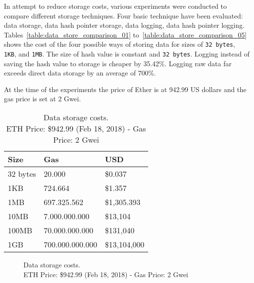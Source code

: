 In attempt to reduce storage costs, various experiments were conducted to compare different storage techniques. Four basic technique have been evaluated: data storage, data hash pointer storage, data logging, data hash pointer logging. Tables~\ref{table:data_store_comparison_01} to~\ref{table:data_store_comparison_05} shows the cost of the four possible ways of storing data for sizes of \verb|32 bytes|, \verb|1KB|, and \verb|1MB|. The size of hash value is constant and \verb|32 bytes|. Logging instead of saving the hash value to storage is cheaper by 35.42\%. Logging raw data far exceeds direct data storage by an average of 700\%.

At the time of the experiments the price of Ether is at 942.99 US dollars and the gas price is set at 2 Gwei.

\begin{table}[!htb]
\centering
\caption{Data storage costs.\\ ETH Price: \$942.99 (Feb 18, 2018) - Gas Price: 2 Gwei}
\begin{tabular}{|l|l|l|}
\hline
 Size & Gas  & USD \\ \hline
 32 bytes & 20.000  & \$0.037 \\ \hline
 1KB & 724.664  & \$1.357 \\ \hline
 1MB & 697.325.562  & \$1,305.393 \\ \hline
 10MB & 7.000.000.000  & \$13,104 \\ \hline
 100MB & 70.000.000.000  & \$131,040 \\ \hline
 1GB & 700.000.000.000  & \$13,104,000 \\ \hline
\end{tabular}
\captionsetup{format=hang, justification=centering}
\label{table:bytes_usd_cost}
\end{table}

\begin{figure}[!htb]
  \centering
  \captionsetup{format=hang, justification=centering}
  \caption{Data storage costs.\\ ETH Price: \$942.99 (Feb 18, 2018) - Gas Price: 2 Gwei}
  \label{fig:bytes_usd_cost}
\end{figure}

